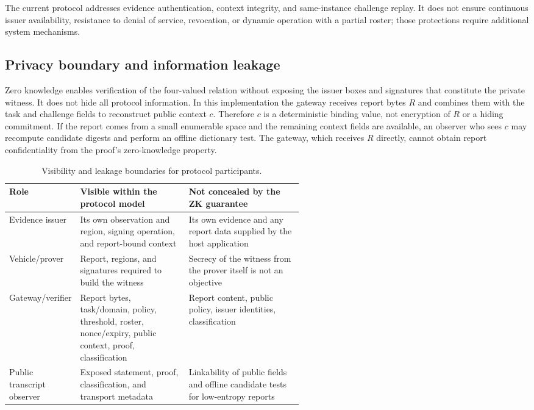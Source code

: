 The current protocol addresses evidence authentication, context integrity, and same-instance challenge replay. It does not ensure continuous issuer availability, resistance to denial of service, revocation, or dynamic operation with a partial roster; those protections require additional system mechanisms.

\subsection{Privacy boundary and information leakage}
Zero knowledge enables verification of the four-valued relation without exposing the issuer boxes and signatures that constitute the private witness. It does not hide all protocol information. In this implementation the gateway receives report bytes $R$ and combines them with the task and challenge fields to reconstruct public context $c$. Therefore $c$ is a deterministic binding value, not encryption of $R$ or a hiding commitment. If the report comes from a small enumerable space and the remaining context fields are available, an observer who sees $c$ may recompute candidate digests and perform an offline dictionary test. The gateway, which receives $R$ directly, cannot obtain report confidentiality from the proof's zero-knowledge property.

\begin{table}[htbp]\centering\footnotesize
\caption{Visibility and leakage boundaries for protocol participants.}\label{tab:privacy-boundary}
\begin{tabularx}{\linewidth}{@{}p{0.19\linewidth}p{0.37\linewidth}X@{}}\toprule
Role & Visible within the protocol model & Not concealed by the ZK guarantee\\\midrule
Evidence issuer & Its own observation and region, signing operation, and report-bound context & Its own evidence and any report data supplied by the host application\\
Vehicle/prover & Report, regions, and signatures required to build the witness & Secrecy of the witness from the prover itself is not an objective\\
Gateway/verifier & Report bytes, task/domain, policy, threshold, roster, nonce/expiry, public context, proof, classification & Report content, public policy, issuer identities, classification\\
Public transcript observer & Exposed statement, proof, classification, and transport metadata & Linkability of public fields and offline candidate tests for low-entropy reports\\\bottomrule
\end{tabularx}\end{table}

